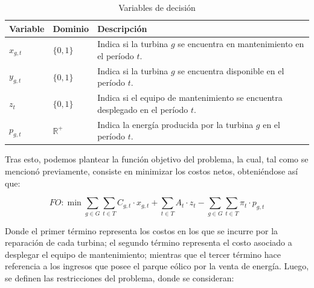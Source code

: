 \begin{table}[htbp]
    \centering
    \small
    \caption{Variables de decisión}
    \label{tab:variables_decision}

    \begin{tabular}{p{} p{} p{}}
        \hline
        \textbf{Variable} & \textbf{Dominio} & \textbf{Descripción} \\
        \hline

        $x_{g,t}$ & $\{0,1\}$ &
        Indica si la turbina $g$ se encuentra en mantenimiento en el período $t$. \\

        $y_{g,t}$ & $\{0,1\}$ &
        Indica si la turbina $g$ se encuentra disponible en el período $t$. \\

        $z_t$ & $\{0,1\}$ &
        Indica si el equipo de mantenimiento se encuentra desplegado en el período $t$. \\

        $p_{g,t}$ & $\mathbb{R}^{+}$ &
        Indica la energía producida por la turbina $g$ en el período $t$. \\

        \hline
    \end{tabular}
\end{table}

Tras esto, podemos plantear la función objetivo del problema, la cual, tal como se mencionó
previamente, consiste en minimizar los costos netos, obteniéndose así que:

\begin{equation}
    FO:
    \min
    \sum_{g \in G}
    \sum_{t \in T}
    C_{g,t} \cdot x_{g,t}
    +
    \sum_{t \in T}
    A_t \cdot z_t
    -
    \sum_{g \in G}
    \sum_{t \in T}
    \pi_t \cdot p_{g,t}
    \tag{1}
\end{equation}

Donde el primer término representa los costos en los que se incurre por la reparación de cada turbina; el segundo término representa el costo asociado a desplegar el equipo de mantenimiento; mientras que el tercer término hace referencia a los ingresos que posee el parque eólico por la venta de energía. Luego, se definen las restricciones del problema, donde se consideran:

